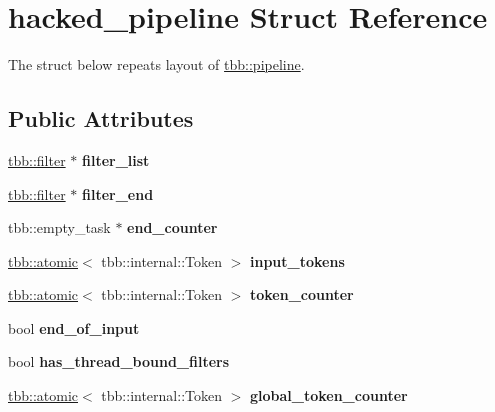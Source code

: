\hypertarget{structhacked__pipeline}{}\section{hacked\+\_\+pipeline Struct Reference}
\label{structhacked__pipeline}


The struct below repeats layout of \hyperlink{classtbb_1_1pipeline}{tbb\+::pipeline}.  


\subsection*{Public Attributes}
\begin{DoxyCompactItemize}
\item 
\hypertarget{structhacked__pipeline_ae7ddcc3877046da0f74f53adc3f7ebd5}{}\hyperlink{classtbb_1_1filter}{tbb\+::filter} $\ast$ {\bfseries filter\+\_\+list}\label{structhacked__pipeline_ae7ddcc3877046da0f74f53adc3f7ebd5}

\item 
\hypertarget{structhacked__pipeline_a6e43f02894fb078392b87f46204efa0c}{}\hyperlink{classtbb_1_1filter}{tbb\+::filter} $\ast$ {\bfseries filter\+\_\+end}\label{structhacked__pipeline_a6e43f02894fb078392b87f46204efa0c}

\item 
\hypertarget{structhacked__pipeline_acb9c21b454bc9b3b5ed6858344e3a00a}{}tbb\+::empty\+\_\+task $\ast$ {\bfseries end\+\_\+counter}\label{structhacked__pipeline_acb9c21b454bc9b3b5ed6858344e3a00a}

\item 
\hypertarget{structhacked__pipeline_aee55d940f13f09b5f326461bd9f9b73b}{}\hyperlink{structtbb_1_1atomic}{tbb\+::atomic}$<$ tbb\+::internal\+::\+Token $>$ {\bfseries input\+\_\+tokens}\label{structhacked__pipeline_aee55d940f13f09b5f326461bd9f9b73b}

\item 
\hypertarget{structhacked__pipeline_a198f5122d1adfe4798995f0e2461c027}{}\hyperlink{structtbb_1_1atomic}{tbb\+::atomic}$<$ tbb\+::internal\+::\+Token $>$ {\bfseries token\+\_\+counter}\label{structhacked__pipeline_a198f5122d1adfe4798995f0e2461c027}

\item 
\hypertarget{structhacked__pipeline_a9bc645bded7fc36c00efe7e5732a20fb}{}bool {\bfseries end\+\_\+of\+\_\+input}\label{structhacked__pipeline_a9bc645bded7fc36c00efe7e5732a20fb}

\item 
\hypertarget{structhacked__pipeline_ad0feee8b94ef3b914933f90b9397e272}{}bool {\bfseries has\+\_\+thread\+\_\+bound\+\_\+filters}\label{structhacked__pipeline_ad0feee8b94ef3b914933f90b9397e272}

\item 
\hypertarget{structhacked__pipeline_accb0634f593a0de4d4273afbe96cca39}{}\hyperlink{structtbb_1_1atomic}{tbb\+::atomic}$<$ tbb\+::internal\+::\+Token $>$ {\bfseries global\+\_\+token\+\_\+counter}\label{structhacked__pipeline_accb0634f593a0de4d4273afbe96cca39}

\end{DoxyCompactItemize}


